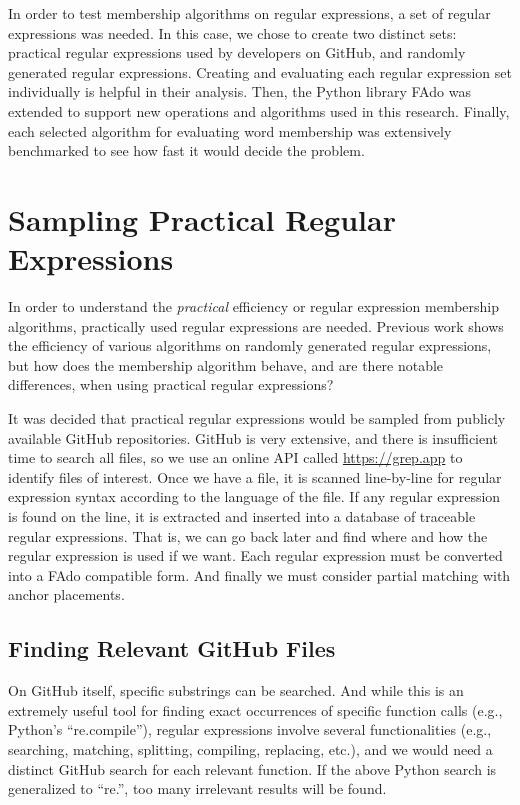 In order to test membership algorithms on regular expressions, a set of regular expressions was needed. In this case, we chose to create two distinct sets: practical regular expressions used by developers on GitHub, and randomly generated regular expressions. Creating and evaluating each regular expression set individually is helpful in their analysis. Then, the Python library FAdo was extended to support new operations and algorithms used in this research. Finally, each selected algorithm for evaluating word membership was extensively benchmarked to see how fast it would decide the problem.


\section{Sampling Practical Regular Expressions}
\label{sec:Sampling Practical Regular Expressions}
In order to understand the \emph{practical} efficiency or regular expression membership algorithms, practically used regular expressions are needed. Previous work \cite{pddag} shows the efficiency of various algorithms on randomly generated regular expressions, but how does the membership algorithm behave, and are there notable differences, when using practical regular expressions?

It was decided that practical regular expressions would be sampled from publicly available GitHub repositories. GitHub is very extensive, and there is insufficient time to search all files, so we use an online API called \url{https://grep.app} \cite{grep.app} to identify files of interest. Once we have a file, it is scanned line-by-line for regular expression syntax according to the language of the file. If any regular expression is found on the line, it is extracted and inserted into a database of traceable regular expressions. That is, we can go back later and find where and how the regular expression is used if we want. Each regular expression must be converted into a FAdo compatible form. And finally we must consider partial matching with anchor placements.

\subsection{Finding Relevant GitHub Files}
\label{subsec:Finding Relevant GitHub Files}
On GitHub itself, specific substrings can be searched. And while this is an extremely useful tool for finding exact occurrences of specific function calls (e.g., Python's ``re.compile''), regular expressions involve several functionalities (e.g., searching, matching, splitting, compiling, replacing, etc.), and we would need a distinct GitHub search for each relevant function. If the above Python search is generalized to ``re.'', too many irrelevant results will be found.

